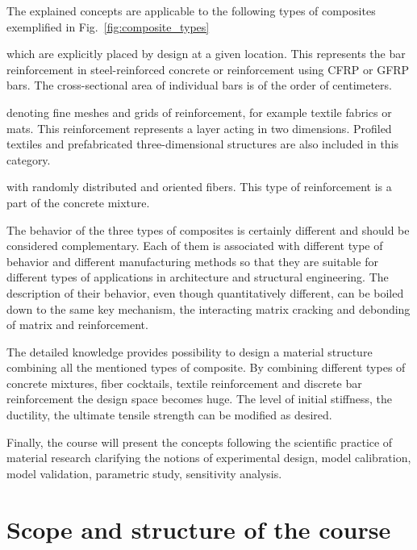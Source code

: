 \documentclass[main.tex]{subfiles}
\begin{document}
The explained concepts are applicable to the following types of composites exemplified in Fig.~\ref{fig:composite_types}
\begin{description}
\itemsep=-1mm
\item[A: Continuous, discrete reinforcement elements] which are explicitly placed by design at a given location. 
This represents the bar reinforcement in steel-reinforced concrete or reinforcement using CFRP or GFRP bars. 
The cross-sectional area of individual bars is of the order of centimeters.
\item[B: Dispersed continuous reinforcement] denoting fine meshes and grids of reinforcement, for example textile fabrics or mats. 
This reinforcement represents a layer acting in two dimensions. Profiled textiles and prefabricated three-dimensional structures 
are also included in this category. 
\item[C: Discontinuous, dispersed short fiber reinforcement] with randomly distributed and oriented fibers. This type of reinforcement is a part of the concrete mixture.
\end{description}

The behavior of the three types of composites is certainly different and should be 
considered complementary. Each of them is associated with different type of behavior 
and different manufacturing methods so that they are suitable for different 
types of applications in architecture and structural engineering.
The description of their behavior, even though quantitatively different, 
can be boiled down to the same key mechanism, the interacting matrix cracking 
and debonding of matrix and reinforcement.

The detailed knowledge provides possibility to design a material structure combining all the mentioned types of composite. By combining different types of concrete mixtures, fiber cocktails, textile reinforcement and discrete bar reinforcement the design space becomes huge. The level of initial stiffness, the ductility, the ultimate tensile strength can be modified as desired.

Finally, the course will present the concepts following the scientific practice of material research clarifying the notions of experimental design, model calibration, model validation, parametric study, sensitivity analysis.  

\section{Scope and structure of the course}
\end{document}
